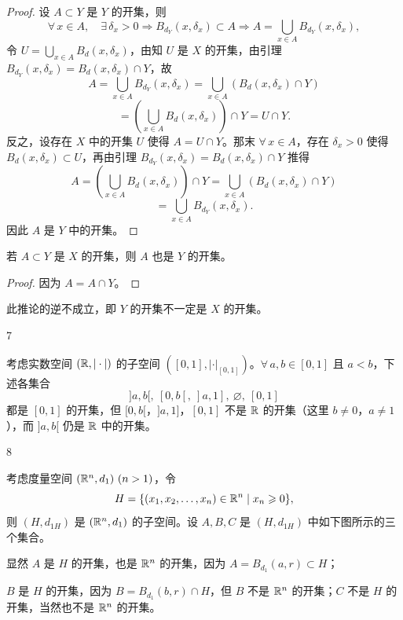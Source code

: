 \begin{proof}

设 $A\subset Y$ 是 $Y$ 的开集，则
\[\forall\,x\in A,\quad\exists\,\delta_x>0\Longrightarrow B_{d_Y}(x,\delta_x)\subset A\Longrightarrow A=\bigcup_{x\in A}B_{d_Y}(x,\delta_x),\]
令 $U=\displaystyle\bigcup_{x\in A}B_d(x,\delta_x)$，由知 $U$ 是 $X$ 的开集，由引理 $B_{d_Y}(x,\delta_x)=B_d(x,\delta_x)\cap Y$，故
\[A=\bigcup_{x\in A}B_{d_Y}(x,\delta_x)=\bigcup_{x\in A}(B_d(x,\delta_x)\cap Y)\]
\[=\left(\bigcup_{x\in A}B_d(x,\delta_x)\right)\cap Y=U\cap Y.\]
反之，设存在 $X$ 中的开集 $U$ 使得 $A=U\cap Y$。那末 $\forall\,x\in A$，存在 $\delta_x>0$ 使得 $B_d(x,\delta_x)\subset U$，再由引理 $B_{d_Y}(x,\delta_x)=B_d(x,\delta_x)\cap Y$ 推得
\[A=\left(\bigcup_{x\in A}B_d(x,\delta_x)\right)\cap Y=\bigcup_{x\in A}(B_d(x,\delta_x)\cap Y)\]
\[=\bigcup_{x\in A}B_{d_Y}(x,\delta_x).\]
因此 $A$ 是 $Y$ 中的开集。

\end{proof}

\begin{mycor*}{}

若 $A\subset Y$ 是 $X$ 的开集，则 $A$ 也是 $Y$ 的开集。

\end{mycor*}

\begin{proof}

因为 $A=A\cap Y$。

\end{proof}

此推论的逆不成立，即 $Y$ 的开集不一定是 $X$ 的开集。

\begin{sourceexample}{7}

考虑实数空间 $(\mathbb{R},|\cdot|)$ 的子空间 $([0,1],|\cdot|_{[0,1]})$。$\forall\,a,b\in[0,1]$ 且 $a<b$，下述各集合
\[]a,b[,\ [0,b[,\ ]a,1],\ \varnothing,\ [0,1]\]
都是 $[0,1]$ 的开集，但 $[0,b[$，$]a,1]$，$[0,1]$ 不是 $\mathbb{R}$ 的开集（这里 $b\neq0$，$a\neq1$），而 $]a,b[$ 仍是 $\mathbb{R}$ 中的开集。

\end{sourceexample}

\begin{sourceexample}{8}

考虑度量空间 $(\R^n,d_1)\ (n>1)$，令
\[H=\{(x_1,x_2,\dots,x_n)\in\mathbb{R}^n\mid x_n\geqslant0\},\]
则 $(H,d_{1H})$ 是 $(\mathbb{R}^n,d_1)$ 的子空间。设 $A,B,C$ 是 $(H,d_{1H})$ 中如下图所示的三个集合。

显然 $A$ 是 $H$ 的开集，也是 $\mathbb{R}^n$ 的开集，因为 $A=B_{d_1}(a,r)\subset H$；

$B$ 是 $H$ 的开集，因为 $B=B_{d_1}(b,r)\cap H$，但 $B$ 不是 $\mathbb{R}^n$ 的开集；$C$ 不是 $H$ 的开集，当然也不是 $\mathbb{R}^n$ 的开集。

\end{sourceexample}

